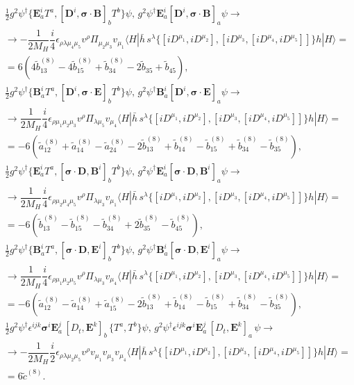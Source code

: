 \begin{eqnarray}
&&\frac12g^2\psi^\dagger\{\bm{E}^i_aT^a,[\bm{D}^i,\bm{\sigma}\cdot\bm{B}]_bT^b\}\psi, \,g^2\psi^\dagger\bm{E}^i_a [\bm{D}^i,\bm{\sigma}\cdot\bm{B}]_a\psi\to\nonumber\\
&&\to  -\dfrac1{2M_H}\dfrac{i}4\epsilon_{\rho\lambda\mu_4\mu_5}v^\rho \Pi_{\mu_2\mu_3}v_{\mu_1}\langle H |\bar h\,s^\lambda \{[iD^{\mu_1},iD^{\mu_2}],[iD^{\mu_3},[iD^{\mu_4},iD^{\mu_5}]]\}h|H\rangle=\nonumber\\
&&=6\left(4 \tilde{b}_{13}^{(8)}-4\tilde{b}_{15}^{(8)}+\tilde{b}_{34}^{(8)}-2\tilde{b}_{35}+\tilde{b}_{45}\right),\nonumber\\
&&\frac12g^2\psi^\dagger\{\bm{B}^i_aT^a,[\bm{D}^i,\bm{\sigma}\cdot\bm{E}]_bT^b\}\psi, \,g^2\psi^\dagger\bm{B}^i_a [\bm{D}^i,\bm{\sigma}\cdot\bm{E}]_a\psi\to\nonumber\\
&&\to  \dfrac1{2M_H}\dfrac{i}4\epsilon_{\rho\mu_1\mu_2\mu_3}v^\rho \Pi_{\lambda\mu_5}v_{\mu_4}\langle H |\bar h\,s^\lambda \{[iD^{\mu_1},iD^{\mu_2}],[iD^{\mu_3},[iD^{\mu_4},iD^{\mu_5}]]\}h|H\rangle=\nonumber\\
&&=-6\left(\tilde{a}_{12}^{(8)}+ \tilde{a}_{14}^{(8)}- \tilde{a}_{24}^{(8)}-2 \tilde{b}_{13}^{(8)}+\tilde{b}_{14}^{(8)}-\tilde{b}_{15}^{(8)}+\tilde{b}_{34}^{(8)}-\tilde{b}_{35}^{(8)}\right),\nonumber\\
%
&&\frac12g^2\psi^\dagger\{\bm{E}^i_aT^a,[\bm{\sigma}\cdot\bm{D}, \bm{B}^i]_bT^b\}\psi,\, g^2\psi^\dagger\bm{E}^i_a[\bm{\sigma}\cdot\bm{D}, \bm{B}^i]_a\psi\to\nonumber\\
&&\to  \dfrac1{2M_H}\dfrac{i}4\epsilon_{\rho\mu_2\mu_4\mu_5}v^\rho \Pi_{\lambda\mu_3}v_{\mu_1}\langle H |\bar h\,s^\lambda \{[iD^{\mu_1},iD^{\mu_2}],[iD^{\mu_3},[iD^{\mu_4},iD^{\mu_5}]]\}h|H\rangle=\nonumber\\
&&=-6\left(\tilde{b}_{13}^{(8)}-\tilde{b}_{15}^{(8)}-\tilde{b}_{34}^{(8)}+2\tilde{b}_{35}^{(8)}-\tilde{b}_{45}^{(8)}\right),\nonumber\\
%
&&\frac12g^2\psi^\dagger\{\bm{B}^i_aT^a,[\bm{\sigma}\cdot\bm{D}, \bm{E}^i]_bT^b\}\psi,\,g^2\psi^\dagger\bm{B}^i_a[\bm{\sigma}\cdot\bm{D}, \bm{E}^i]_a\psi\to\nonumber\\
&&\to  \dfrac1{2M_H}\dfrac{i}4\epsilon_{\rho\mu_1\mu_2\mu_5}v^\rho \Pi_{\lambda\mu_3}v_{\mu_4}\langle H |\bar h\,s^\lambda \{[iD^{\mu_1},iD^{\mu_2}],[iD^{\mu_3},[iD^{\mu_4},iD^{\mu_5}]]\}h|H\rangle=\nonumber\\
&&=-6\left(\tilde{a}_{12}^{(8)}-\tilde{a}_{14}^{(8)}+ \tilde{a}_{15}^{(8)}-2\tilde{b}_{13}^{(8)}+\tilde{b}_{14}^{(8)}-\tilde{b}_{15}^{(8)}+\tilde{b}_{34}^{(8)}-\tilde{b}_{35}^{(8)}\right),\nonumber\\
%
&&\frac12g^2\psi^\dagger\epsilon^{ijk}\bm{\sigma}^i\bm{E}^j_a\, [{D_t},\bm{E}^k]_b\,\{T^a,T^b\}\psi,\,g^2\psi^\dagger\epsilon^{ijk}\bm{\sigma}^i\bm{E}^j_a\, [{D_t},\bm{E}^k]_a\,\psi \to\nonumber\\
&&\to  -\dfrac1{2M_H}\dfrac{i}2\epsilon_{\rho\lambda\mu_2\mu_5}v^\rho v_{\mu_1}v_{\mu_3}v_{\mu_4}\langle H |\bar h\,s^\lambda \{[iD^{\mu_1},iD^{\mu_2}],[iD^{\mu_3},[iD^{\mu_4},iD^{\mu_5}]]\}h|H\rangle=\nonumber\\
&&=6\tilde{c}^{(8)}.
\end{eqnarray}


